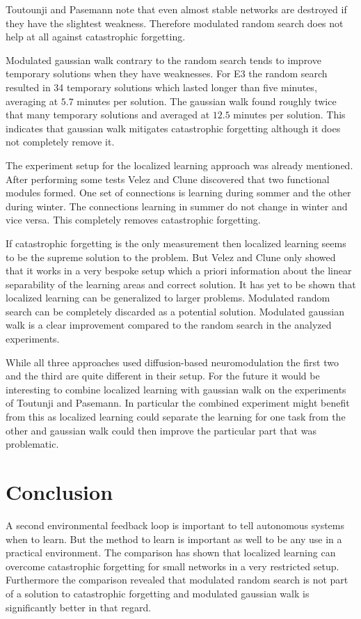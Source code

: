 \documentclass[12pt,twoside]{scrartcl}
\theoremstyle{plain}
\theoremstyle{definition}
\theoremstyle{remark}
\begin{document}
Toutounji and Pasemann note that even almost stable networks are destroyed
if they have the slightest weakness. Therefore modulated random search
does not help at all against catastrophic forgetting.

Modulated gaussian walk contrary to the random search tends to improve temporary
solutions when they have weaknesses. For E3 the random search resulted in 34
temporary solutions which lasted longer than five minutes, averaging at \(5.7\)
minutes per solution. The gaussian walk found roughly twice that many temporary
solutions and averaged at \(12.5\) minutes per solution. This indicates that
gaussian walk mitigates catastrophic forgetting although it does not completely
remove it.

The experiment setup for the localized learning approach was already mentioned.
After performing some tests Velez and Clune discovered that two functional
modules formed. One set of connections is learning during sommer and the other
during winter. The connections learning in summer do not change in winter and
vice versa. This completely removes catastrophic forgetting.

If catastrophic forgetting is the only measurement then localized learning
seems to be the supreme solution to the problem. But Velez and Clune only
showed that it works in a very bespoke setup which a priori information about
the linear separability of the learning areas and correct solution. It has yet
to be shown that localized learning can be generalized to larger problems.
Modulated random search can be completely discarded as a potential solution.
Modulated gaussian walk is a clear improvement compared to the random search
in the analyzed experiments.

While all three approaches used diffusion-based neuromodulation the first two and
the third are quite different in their setup. For the future it would be interesting
to combine localized learning with gaussian walk on the experiments of Toutunji
and Pasemann. In particular the combined experiment might benefit from this as
localized learning could separate the learning for one task from the other
and gaussian walk could then improve the particular part that was problematic.

\section{Conclusion}
\label{sec:concl}

A second environmental feedback loop is important to tell autonomous systems
when to learn. But the method to learn is important as well to be any use
in a practical environment. The comparison has shown that localized learning
can overcome catastrophic forgetting for small networks in a very restricted
setup. Furthermore the comparison revealed that modulated random search is
not part of a solution to catastrophic forgetting and modulated gaussian
walk is significantly better in that regard.
\end{document}
